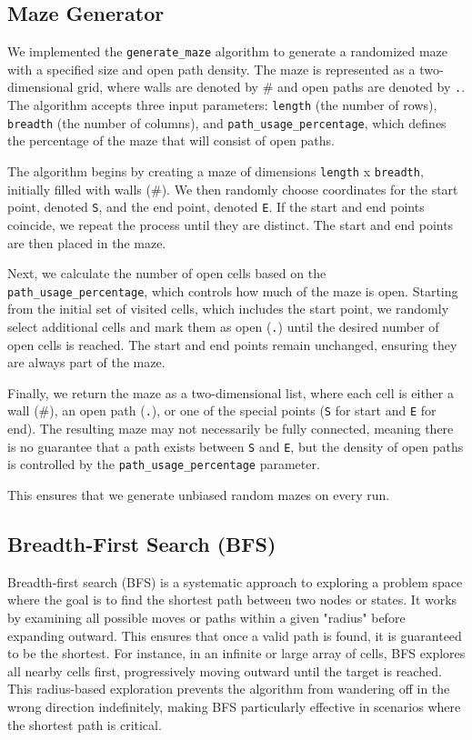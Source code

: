 \documentclass[final, journal, 11pt]{report}
\begin{document}
	\subsection*{Maze Generator}
	
	We implemented the \texttt{generate\_maze} algorithm to generate a randomized maze with a specified size and open path density. The maze is represented as a two-dimensional grid, where walls are denoted by \# and open paths are denoted by \texttt{.}. The algorithm accepts three input parameters: \texttt{length} (the number of rows), \texttt{breadth} (the number of columns), and \texttt{path\_usage\_percentage}, which defines the percentage of the maze that will consist of open paths. 
	
	The algorithm begins by creating a maze of dimensions \texttt{length} x \texttt{breadth}, initially filled with walls (\#). We then randomly choose coordinates for the start point, denoted \texttt{S}, and the end point, denoted \texttt{E}. If the start and end points coincide, we repeat the process until they are distinct. The start and end points are then placed in the maze.
	
	Next, we calculate the number of open cells based on the \texttt{path\_usage\_percentage}, which controls how much of the maze is open. Starting from the initial set of visited cells, which includes the start point, we randomly select additional cells and mark them as open (\texttt{.}) until the desired number of open cells is reached. The start and end points remain unchanged, ensuring they are always part of the maze.
	
	Finally, we return the maze as a two-dimensional list, where each cell is either a wall (\#), an open path (\texttt{.}), or one of the special points (\texttt{S} for start and \texttt{E} for end). The resulting maze may not necessarily be fully connected, meaning there is no guarantee that a path exists between \texttt{S} and \texttt{E}, but the density of open paths is controlled by the \texttt{path\_usage\_percentage} parameter.
	
	This ensures that we generate unbiased random mazes on every run.
	
	
	\subsection*{Breadth-First Search (BFS)}
	
	Breadth-first search (BFS) is a systematic approach to exploring a problem space where the goal is to find the shortest path between two nodes or states. It works by examining all possible moves or paths within a given "radius" before expanding outward. This ensures that once a valid path is found, it is guaranteed to be the shortest. For instance, in an infinite or large array of cells, BFS explores all nearby cells first, progressively moving outward until the target is reached. This radius-based exploration prevents the algorithm from wandering off in the wrong direction indefinitely, making BFS particularly effective in scenarios where the shortest path is critical.
	
\end{document}
